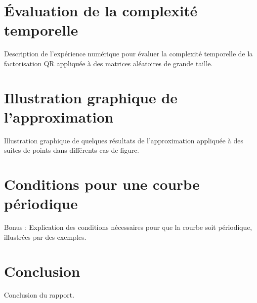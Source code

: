 \documentclass[11pt]{article}
\begin{document}
\section{Évaluation de la complexité temporelle}
Description de l'expérience numérique pour évaluer la complexité temporelle de la factorisation QR appliquée à des matrices aléatoires de grande taille.

\section{Illustration graphique de l'approximation}
Illustration graphique de quelques résultats de l'approximation appliquée à des suites de points dans différents cas de figure.

\section{Conditions pour une courbe périodique}
Bonus : Explication des conditions nécessaires pour que la courbe soit périodique, illustrées par des exemples.

\section{Conclusion}
Conclusion du rapport.

%
\end{document}
